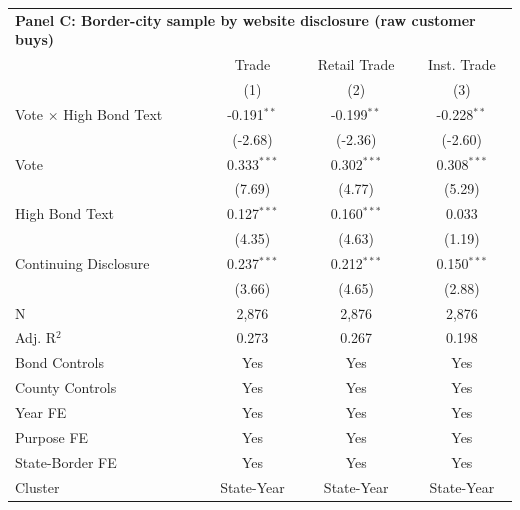 \begingroup
\centering
\begin{tabular*}{\textwidth}{@{\extracolsep{\fill}}lccc}
\multicolumn{5}{l}{\textbf{Panel C: Border-city sample by website disclosure (raw customer buys)}}\\

\addlinespace
   \toprule
                                 & Trade         & Retail Trade  & Inst. Trade\\  
                                 & (1)           & (2)           & (3)\\  
   \midrule 
   Vote $\times$ High Bond Text  & -0.191$^{**}$ & -0.199$^{**}$ & -0.228$^{**}$\\   
                                 & (-2.68)      & (-2.36)      & (-2.60)\\   
   Vote                          & 0.333$^{***}$ & 0.302$^{***}$ & 0.308$^{***}$\\   
                                 & (7.69)       & (4.77)       & (5.29)\\   
   High Bond Text                & 0.127$^{***}$ & 0.160$^{***}$ & 0.033\\   
                                 & (4.35)       & (4.63)       & (1.19)\\   
   Continuing Disclosure         & 0.237$^{***}$ & 0.212$^{***}$ & 0.150$^{***}$\\   
                                 & (3.66)       & (4.65)       & (2.88)\\   
   \hline
   N                  & 2,876         & 2,876         & 2,876\\  
   Adj. R$^2$                & 0.273         & 0.267         & 0.198\\  
   Bond Controls                 & Yes           & Yes           & Yes\\  
   County Controls               & Yes           & Yes           & Yes\\  
   Year FE                       & Yes           & Yes           & Yes\\  
   Purpose FE                    & Yes           & Yes           & Yes\\  
   State-Border FE               & Yes           & Yes           & Yes\\  
   Cluster              & State-Year & State-Year & State-Year\\  
   \bottomrule
\end{tabular*}
\par\endgroup
